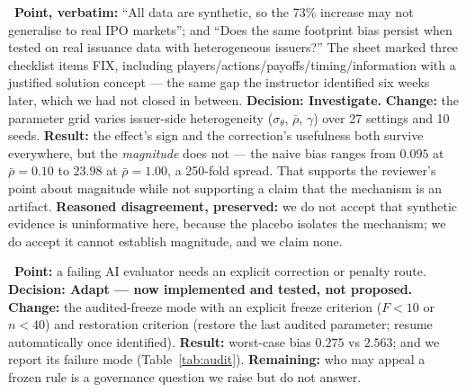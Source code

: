 \begin{description}[leftmargin=0pt,labelsep=4pt,style=unboxed,itemsep=4pt]
\item[\textbf{Zhenning Wang, signed review sheet, 28 September 2026, recommendation Investigate}]\ \textbf{Point, verbatim:} ``All data are synthetic, so the 73\% increase may not generalise to real IPO markets''; and ``Does the same footprint bias persist when tested on real issuance data with heterogeneous issuers?'' The sheet marked three checklist items FIX, including players/actions/payoffs/timing/information with a justified solution concept --- the same gap the instructor identified six weeks later, which we had not closed in between. \textbf{Decision: Investigate.} \textbf{Change:} the parameter grid varies issuer-side heterogeneity ($\sigma_\theta$, $\bar\rho$, $\gamma$) over 27 settings and 10 seeds. \textbf{Result:} the effect's sign and the correction's usefulness both survive everywhere, but the \emph{magnitude} does not --- the naive bias ranges from $0.095$ at $\bar\rho=0.10$ to $23.98$ at $\bar\rho=1.00$, a 250-fold spread. That supports the reviewer's point about magnitude while not supporting a claim that the mechanism is an artifact. \textbf{Reasoned disagreement, preserved:} we do not accept that synthetic evidence is uninformative here, because the placebo isolates the mechanism; we do accept it cannot establish magnitude, and we claim none.
\item[\textbf{Han Zhang, Liberata}]\ \textbf{Point:} a failing AI evaluator needs an explicit correction or penalty route. \textbf{Decision: Adapt --- now implemented and tested, not proposed.} \textbf{Change:} the audited-freeze mode with an explicit freeze criterion ($F<10$ or $n<40$) and restoration criterion (restore the last audited parameter; resume automatically once identified). \textbf{Result:} worst-case bias $0.275$ vs $2.563$; and we report its failure mode (Table~\ref{tab:audit}). \textbf{Remaining:} who may appeal a frozen rule is a governance question we raise but do not answer.

\end{description}
